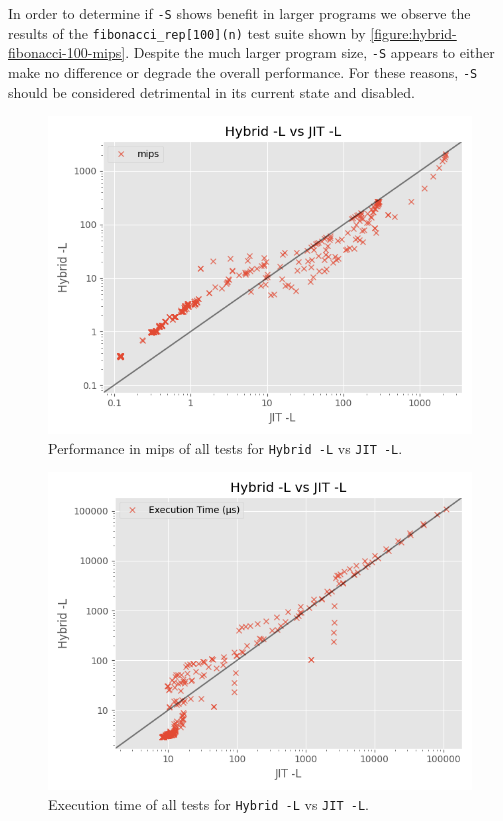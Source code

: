 In order to determine if \texttt{-S} shows benefit in larger programs we observe the results of the \texttt{fibonacci\_rep[100](n)} test suite shown by \autoref{figure:hybrid-fibonacci-100-mips}. Despite the much larger program size, \texttt{-S} appears to either make no difference or degrade the overall performance. For these reasons, \texttt{-S} should be considered detrimental in its current state and disabled.


\begin{figure}[H]
    \centering
    \includegraphics[scale=0.75]{output/graphs/scatter/vs/JIT -L-vs-Hybrid -L-mips.png}
    \caption{Performance in mips of all tests for \texttt{Hybrid -L} vs \texttt{JIT -L}.}
    \label{figure:hybrid-l-vs-jit-l-mips}
\end{figure}


\begin{figure}[H]
    \centering
    \includegraphics[scale=0.75]{output/graphs/scatter/vs/JIT -L-vs-Hybrid -L-time.png}
    \caption{Execution time of all tests for \texttt{Hybrid -L} vs \texttt{JIT -L}.}
    \label{figure:hybrid-l-vs-jit-l-time}
\end{figure}

